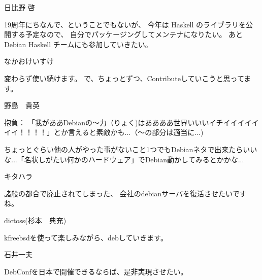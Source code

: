 %

\begin{prework}{ 日比野 啓 }

19周年にちなんで、ということでもないが、
今年は Haskell のライブラリを公開する予定なので、
自分でパッケージングしてメンテナになりたい。
あと Debian Haskell チームにも参加していきたい。

\end{prework}

\begin{prework}{ なかおけいすけ }

変わらず使い続けます。
で、ちょっとずつ、Contributeしていこうと思ってます。
\end{prework}

\begin{prework}{ 野島　貴英 }

抱負：
「我がああDebianの～力（りょく)はああああ世界いいいイチイイイイイイイ！！！！」とか言えると素敵かも...（～の部分は適当に...)
 
ちょっとぐらい他の人がやった事がないこと1つでもDebianネタで出来たらいいな...「名状しがたい何かのハードウェア」でDebian動かしてみるとかかな...

\end{prework}

\begin{prework}{ キタハラ }

諸般の都合で廃止されてしまった、
会社のdebianサーバを復活させたいですね。

\end{prework}

\begin{prework}{ dictoss(杉本　典充) }

kfreebsdを使って楽しみながら、debしていきます。
\end{prework}

\begin{prework}{ 石井一夫 }

DebConfを日本で開催できるならば、是非実現させたい。
\end{prework}
